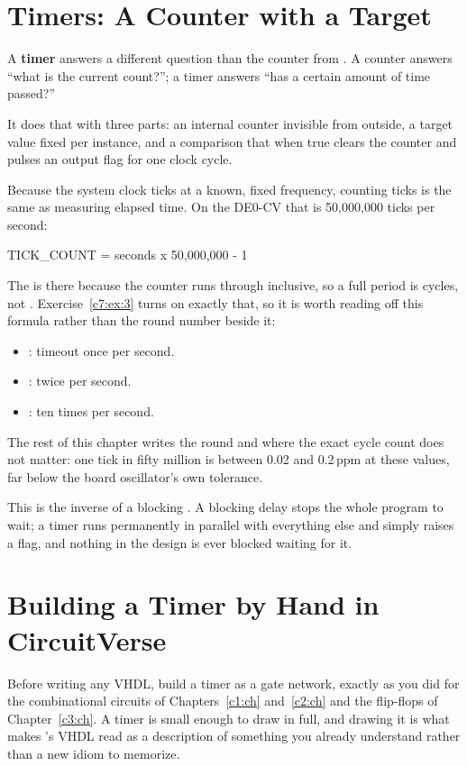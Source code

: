 
\section{Timers: A Counter with a Target}
\label{c7:a1}
A \textbf{timer} answers a different question than the counter from . A counter
answers ``what is the current count?''; a timer answers ``has a certain amount of time passed?''

It does that with three parts: an internal counter invisible from outside, a target value
 fixed per instance, and a comparison that when true clears the counter and pulses
an output flag  for one clock cycle.

Because the system clock ticks at a known, fixed frequency, counting ticks is the same as measuring
elapsed time. On the DE0-CV that is 50,000,000 ticks per second:

\begin{console}
TICK_COUNT = seconds x 50,000,000 - 1
\end{console}

\noindent The  is there because the counter runs  through 
inclusive, so a full period is  cycles, not .
Exercise~\ref{c7:ex:3} turns on exactly that, so it is worth reading off this formula rather than
the round number beside it:
\begin{itemize}
  \item {}: timeout once per second.
  \item {}: twice per second.
  \item {}: ten times per second.
\end{itemize}
The rest of this chapter writes the round  and  where the exact
cycle count does not matter: one tick in fifty million is between 0.02 and 0.2\,ppm at these
values, far below the board oscillator's own tolerance.

This is the inverse of a blocking . A blocking delay stops the whole program to
wait; a timer runs permanently in parallel with everything else and simply raises a flag, and
nothing in the design is ever blocked waiting for it.

\section{Building a Timer by Hand in CircuitVerse}
\label{c7:a2}
Before writing any VHDL, build a timer as a gate network, exactly as you did for the combinational
circuits of Chapters~\ref{c1:ch} and~\ref{c2:ch} and the flip-flops of Chapter~\ref{c3:ch}. A timer
is small enough to draw in full, and drawing it is what makes 's VHDL read as a
description of something you already understand rather than a new idiom to memorize.


